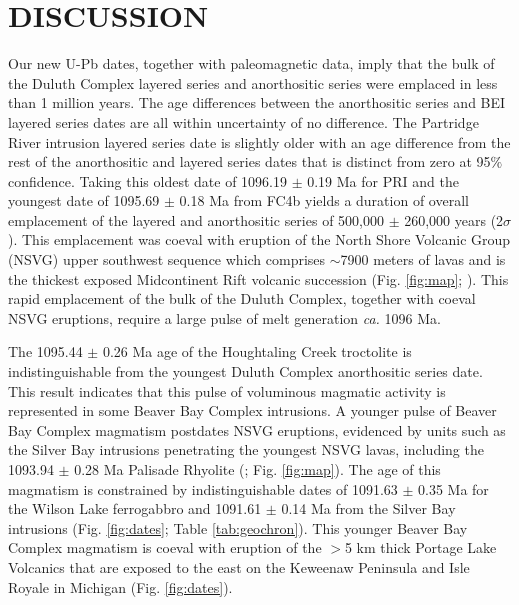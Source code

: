 \documentclass[11pt,letterpaper]{article}
\begin{document}
\section*{DISCUSSION}

Our new U-Pb dates, together with paleomagnetic data, imply that the bulk of the Duluth Complex layered series and anorthositic series were emplaced in less than 1 million years. The age differences between the anorthositic series and BEI layered series dates are all within uncertainty of no difference. The Partridge River intrusion layered series date is slightly older with an age difference from the rest of the anorthositic and layered series dates that is distinct from zero at 95$\%$ confidence. Taking this oldest date of 1096.19 $\pm$ 0.19 Ma for PRI and the youngest date of 1095.69 $\pm$ 0.18 Ma from FC4b yields a duration of overall emplacement of the layered and anorthositic series of 500,000 $\pm$ 260,000 years (2$\sigma$).  This emplacement was coeval with eruption of the North Shore Volcanic Group (NSVG) upper southwest sequence which comprises $\sim$7900 meters of lavas and is the thickest exposed Midcontinent Rift volcanic succession (Fig. \ref{fig:map}; \citealp{Green2011a,Swanson-Hysell2019a}). This rapid emplacement of the bulk of the Duluth Complex, together with coeval NSVG eruptions, require a large pulse of melt generation \textit{ca.} 1096 Ma.



The 1095.44 $\pm$ 0.26 Ma age of the Houghtaling Creek troctolite is indistinguishable from the youngest Duluth Complex anorthositic series date. This result indicates that this pulse of voluminous magmatic activity is represented in some Beaver Bay Complex intrusions. A younger pulse of Beaver Bay Complex magmatism postdates NSVG eruptions, evidenced by units such as the Silver Bay intrusions penetrating the youngest NSVG lavas, including the 1093.94 $\pm$ 0.28 Ma Palisade Rhyolite (\citealp{Miller2001a, Swanson-Hysell2019a}; Fig. \ref{fig:map}). The age of this magmatism is constrained by indistinguishable dates of 1091.63 $\pm$ 0.35 Ma for the Wilson Lake ferrogabbro and 1091.61 $\pm$ 0.14 Ma from the Silver Bay intrusions (Fig. \ref{fig:dates}; Table \ref{tab:geochron}). This younger Beaver Bay Complex magmatism is coeval with eruption of the $>$5 km thick Portage Lake Volcanics that are exposed to the east on the Keweenaw Peninsula and Isle Royale in Michigan (Fig. \ref{fig:dates}).
\end{document}
